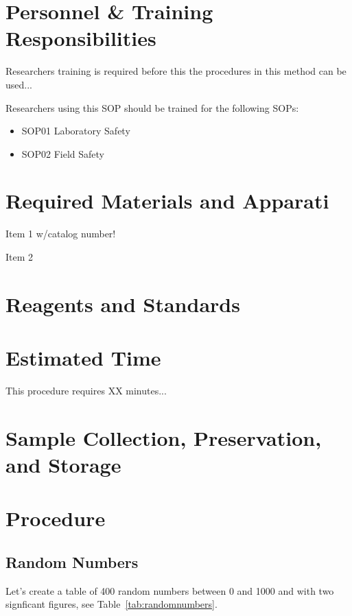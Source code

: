 \documentclass[12pt]{../SOP3_beta}\usepackage[]{graphicx}\usepackage[]{color}
\begin{document}
\section{Personnel \& Training Responsibilities}

\NP Researchers training is required before this the procedures in this method can be used... 

\NP Researchers using this SOP should be trained for the following SOPs:

\begin{itemize}
  \item SOP01 Laboratory Safety
  \item SOP02 Field Safety
\end{itemize}

\section{Required Materials and Apparati}

\NP Item 1 w/catalog number!

\NP Item 2

\section{Reagents and Standards}

\section{Estimated Time}

\NP This procedure requires XX minutes...

\section{Sample Collection, Preservation, and Storage}

\section{Procedure}

\subsection{Random Numbers}

\NP Let's create a table of 400 random numbers between 0 and 1000 and with two signficant figures, see Table~\ref{tab:randomnumbers}.
\end{document}
